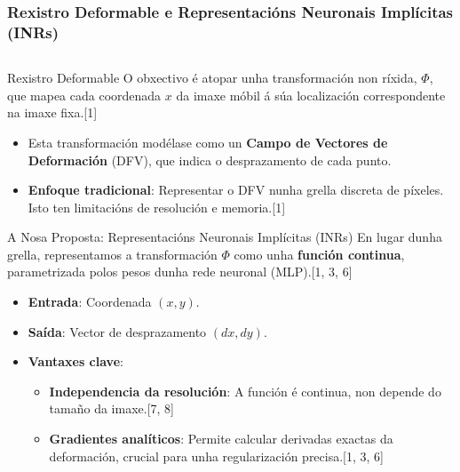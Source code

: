 \documentclass[xcolor=dvipsnames]{beamer}
\begin{document}
\begin{frame}
    \frametitle{Rexistro Deformable e Representacións Neuronais Implícitas (INRs)}
    
    \begin{columns}
        \begin{column}{0.55\textwidth}
            \begin{block}{Rexistro Deformable}
                O obxectivo é atopar unha transformación non ríxida, $\Phi$, que mapea cada coordenada $x$ da imaxe móbil á súa localización correspondente na imaxe fixa.[1]
                \begin{itemize}
                    \item Esta transformación modélase como un \textbf{Campo de Vectores de Deformación} (DFV), que indica o desprazamento de cada punto.
                    \item \textbf{Enfoque tradicional}: Representar o DFV nunha grella discreta de píxeles. Isto ten limitacións de resolución e memoria.[1]
                \end{itemize}
            \end{block}
            
            \begin{alertblock}{A Nosa Proposta: Representacións Neuronais Implícitas (INRs)}
                En lugar dunha grella, representamos a transformación $\Phi$ como unha \textbf{función continua}, parametrizada polos pesos dunha rede neuronal (MLP).[1, 3, 6]
                \begin{itemize}
                    \item \textbf{Entrada}: Coordenada $(x, y)$.
                    \item \textbf{Saída}: Vector de desprazamento $(dx, dy)$.
                    \item \textbf{Vantaxes clave}:
                    \begin{itemize}
                        \item \textbf{Independencia da resolución}: A función é continua, non depende do tamaño da imaxe.[7, 8]
                        \item \textbf{Gradientes analíticos}: Permite calcular derivadas exactas da deformación, crucial para unha regularización precisa.[1, 3, 6]
                    \end{itemize}
                \end{itemize}
            \end{alertblock}
        \end{column}
        

\end{columns}
\end{frame}
\end{document}

